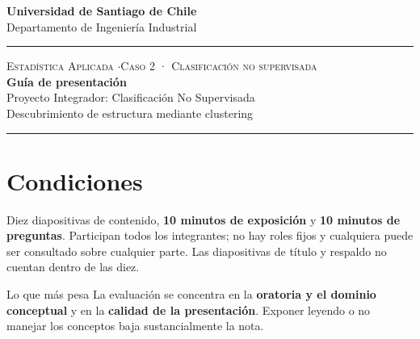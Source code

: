 \documentclass[11pt,letterpaper]{article}
\newcommand{\hrulethin}{\noindent\rule{\textwidth}{0.6pt}}
\begin{document}
\pagestyle{plain}
\begin{center}
    \textbf{\large Universidad de Santiago de Chile}\\[0.1cm]
    Departamento de Ingeniería Industrial
\end{center}
\vspace{0.15cm}\hrulethin\vspace{0.35cm}
\begin{center}
    {\scshape Estadística Aplicada \quad$\cdot$\quad Caso 2 · Clasificación no supervisada}\\[0.35cm]
    {\LARGE \textbf{Guía de presentación}}\\[0.15cm]
    {\large Proyecto Integrador: Clasificación No Supervisada}\\[0.2cm]
    Descubrimiento de estructura mediante clustering
\end{center}
\vspace{0.2cm}\hrulethin\vspace{0.4cm}
\section*{Condiciones}
Diez diapositivas de contenido, \textbf{10 minutos de exposición} y \textbf{10 minutos de preguntas}. Participan
todos los integrantes; no hay roles fijos y cualquiera puede ser consultado sobre cualquier parte. Las
diapositivas de título y respaldo no cuentan dentro de las diez.

\begin{alertbox}{Lo que más pesa}
La evaluación se concentra en la \textbf{oratoria y el dominio conceptual} y en la \textbf{calidad de la presentación}. Exponer leyendo o no manejar los conceptos baja sustancialmente la nota.
\end{alertbox}
\end{document}
